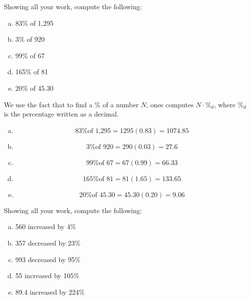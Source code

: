 \documentclass[11pt,letterpaper]{article}
\begin{document}

 Showing all your work, compute the following:
	\begin{enumerate}[(a)]
	\item 83\% of 1,295
	\item 3\% of 920
	\item 99\% of 67
	\item 165\% of 81
	\item 20\% of 45.30
	\end{enumerate} \pspace

\sol We use the fact that to find a \% of a number $N$, ones computes $N \cdot \%_d$, where $\%_d$ is the percentage written as a decimal. 
\begin{enumerate}[(a)]
\item 
	\[
	\text{83\% of 1,295}= 1295(0.83)= 1074.85
	\] \pspace

\item 
	\[
	\text{3\% of 920}= 290(0.03)= 27.6
	\] \pspace

\item 
	\[
	\text{99\% of 67}= 67(0.99)= 66.33
	\] \pspace

\item 
	\[
	\text{165\% of 81}= 81(1.65)= 133.65
	\] \pspace

\item 
	\[
	\text{20\% of 45.30}= 45.30(0.20)= 9.06
	\] 
\end{enumerate}



\newpage



 Showing all your work, compute the following:
	\begin{enumerate}[(a)]
	\item 560 increased by 4\%
	\item 357 decreased by 23\%
	\item 993 decreased by 95\%
	\item 55 increased by 105\%
	\item 89.4 increased by 224\%
	\end{enumerate} \pspace
\end{document}
